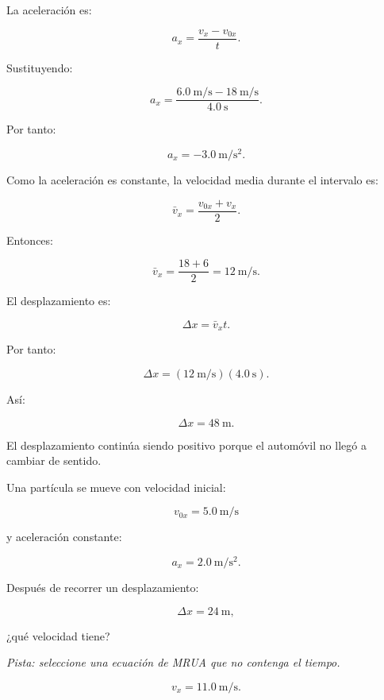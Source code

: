 \begin{explicacion}
La aceleración es:

\[
a_x
=
\frac{v_x-v_{0x}}{t}.
\]

Sustituyendo:

\[
a_x
=
\frac{
\SI{6.0}{\meter\per\second}
-
\SI{18}{\meter\per\second}
}{
\SI{4.0}{\second}
}.
\]

Por tanto:

\[ \boxed{a_x=-\SI{3.0}{\meter\per\second\squared}}. \]

Como la aceleración es constante, la velocidad media durante el intervalo es:

\[
\bar{v}_x
=
\frac{v_{0x}+v_x}{2}.
\]

Entonces:

\[
\bar{v}_x
=
\frac{18+6}{2}
=
\SI{12}{\meter\per\second}.
\]

El desplazamiento es:

\[
\Delta x=\bar{v}_xt.
\]

Por tanto:

\[
\Delta x
=
(\SI{12}{\meter\per\second})
(\SI{4.0}{\second}).
\]

Así:

\[ \boxed{\Delta x=\SI{48}{\meter}}. \]

El desplazamiento continúa siendo positivo porque el automóvil no llegó a cambiar de sentido.
\end{explicacion}


\begin{ejercicio}
Una partícula se mueve con velocidad inicial:

\[ v_{0x}=\SI{5.0}{\meter\per\second} \]

y aceleración constante:

\[ a_x=\SI{2.0}{\meter\per\second\squared}. \]

Después de recorrer un desplazamiento:

\[ \Delta x=\SI{24}{\meter}, \]

¿qué velocidad tiene?

\textit{Pista: seleccione una ecuación de MRUA que no contenga el tiempo.}
\end{ejercicio}

\begin{respuesta}
\[ \boxed{v_x=\SI{11.0}{\meter\per\second}}. \]
\end{respuesta}

